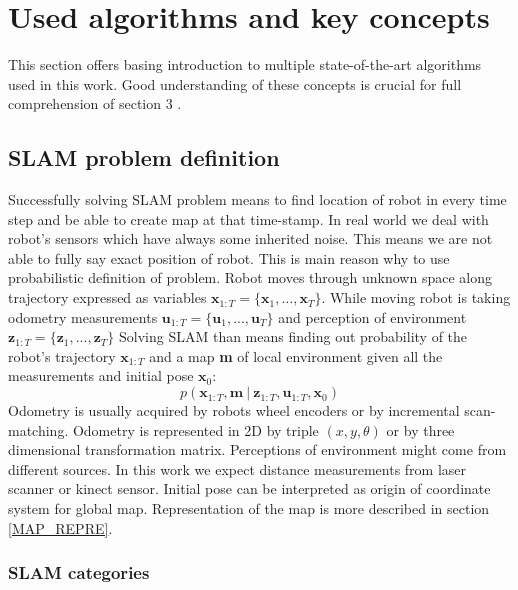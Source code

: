 \chapter{Used algorithms and key concepts}
This section offers basing introduction to multiple state-of-the-art algorithms used in this work. Good understanding of these concepts is crucial for full comprehension of section 3 . 

\section{SLAM problem definition}
Successfully solving \gls{SLAM} problem means to find location of robot in every time step and be able to create map at that time-stamp. In real world we deal with robot's sensors which have always some inherited noise. This means we are not able to fully say exact position of robot. This is main reason why to use probabilistic definition of problem. Robot moves through unknown space along trajectory expressed as variables $ \textbf{x}_{1:T} = \{\textbf{x}_{1},...,\textbf{x}_{T}\} $. While moving robot is taking odometry measurements $ \textbf{u}_{1:T} = \{\textbf{u}_{1},...,\textbf{u}_{T}\}$ and perception of environment $ \textbf{z}_{1:T} = \{\textbf{z}_{1},...,\textbf{z}_{T}\}$ Solving SLAM than means finding out probability of the robot's trajectory $ \textbf{x}_{1:T}$ and a map \textbf{m} of local environment given all the measurements and initial pose $ \textbf{x}_{0}$:
\begin{equation}
p(\textbf{x}_{1:T}, \textbf{m}\: |\:  \textbf{z}_{1:T}, \textbf{u}_{1:T}, \textbf{x}_{0})
\end{equation}
Odometry is usually acquired by robots wheel encoders or by incremental scan-matching. Odometry is represented in 2D by triple $(x,y,\theta)$ or by three dimensional transformation matrix. Perceptions of environment might come from different sources. In this work we expect distance measurements from laser scanner or kinect sensor. Initial pose can be interpreted as origin of coordinate system for global map. Representation of the map is more described in section \ref{MAP_REPRE}.

\subsection{SLAM categories}
\newpage
